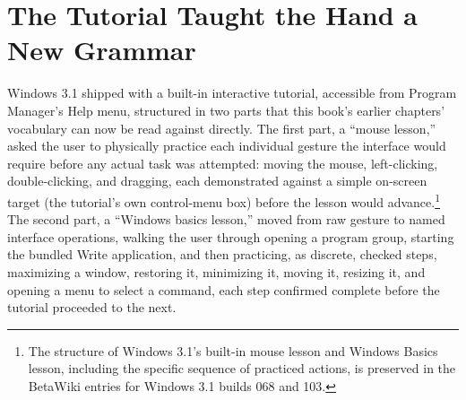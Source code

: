 \documentclass[11pt]{book}
\begin{document}
\section{The Tutorial Taught the Hand a New Grammar}

Windows 3.1 shipped with a built-in interactive tutorial, accessible from Program Manager's Help menu, structured in two parts that this book's earlier chapters' vocabulary can now be read against directly. The first part, a \enquote{mouse lesson,} asked the user to physically practice each individual gesture the interface would require before any actual task was attempted: moving the mouse, left-clicking, double-clicking, and dragging, each demonstrated against a simple on-screen target (the tutorial's own control-menu box) before the lesson would advance.\footnote{The structure of Windows 3.1's built-in mouse lesson and Windows Basics lesson, including the specific sequence of practiced actions, is preserved in the BetaWiki entries for Windows 3.1 builds 068 and 103.} The second part, a \enquote{Windows basics lesson,} moved from raw gesture to named interface operations, walking the user through opening a program group, starting the bundled Write application, and then practicing, as discrete, checked steps, maximizing a window, restoring it, minimizing it, moving it, resizing it, and opening a menu to select a command, each step confirmed complete before the tutorial proceeded to the next.
\end{document}
